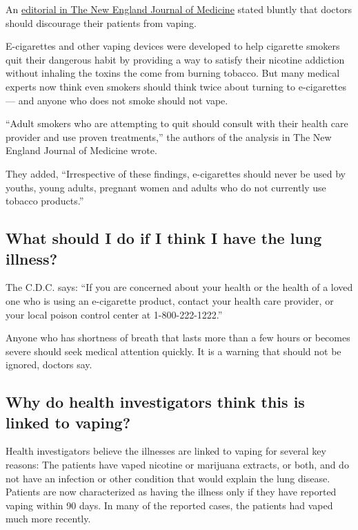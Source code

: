 An \href{https://www.nejm.org/doi/full/10.1056/NEJMe1912032}{editorial
in The New England Journal of Medicine} stated bluntly that doctors
should discourage their patients from vaping.

E-cigarettes and other vaping devices were developed to help cigarette
smokers quit their dangerous habit by providing a way to satisfy their
nicotine addiction without inhaling the toxins the come from burning
tobacco. But many medical experts now think even smokers should think
twice about turning to e-cigarettes --- and anyone who does not smoke
should not vape.

``Adult smokers who are attempting to quit should consult with their
health care provider and use proven treatments,'' the authors of the
analysis in The New England Journal of Medicine wrote.

They added, ``Irrespective of these findings, e-cigarettes should never
be used by youths, young adults, pregnant women and adults who do not
currently use tobacco products.''

\hypertarget{what-should-i-do-if-i-think-i-have-the-lung-illness}{%
\subsection{What should I do if I think I have the lung
illness?}\label{what-should-i-do-if-i-think-i-have-the-lung-illness}}

The C.D.C. says: ``If you are concerned about your health or the health
of a loved one who is using an e-cigarette product, contact your health
care provider, or your local poison control center at 1-800-222-1222.''

Anyone who has shortness of breath that lasts more than a few hours or
becomes severe should seek medical attention quickly. It is a warning
that should not be ignored, doctors say.

\hypertarget{why-do-health-investigators-think-this-is-linked-to-vaping}{%
\subsection{Why do health investigators think this is linked to
vaping?}\label{why-do-health-investigators-think-this-is-linked-to-vaping}}

Health investigators believe the illnesses are linked to vaping for
several key reasons: The patients have vaped nicotine or marijuana
extracts, or both, and do not have an infection or other condition that
would explain the lung disease. Patients are now characterized as having
the illness only if they have reported vaping within 90 days. In many of
the reported cases, the patients had vaped much more recently.

